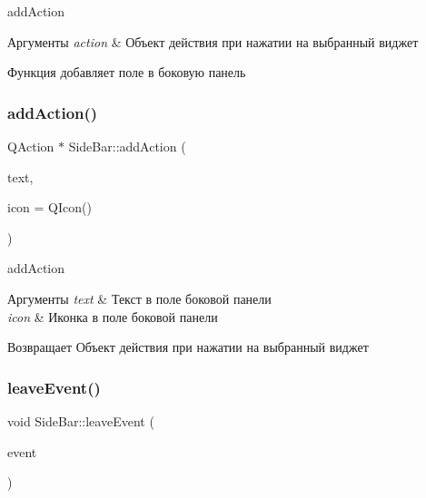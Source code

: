 add\+Action 


\begin{DoxyParams}{Аргументы}
{\em action} & Объект действия при нажатии на выбранный виджет\\
\hline
\end{DoxyParams}
Функция добавляет поле в боковую панель \mbox{\label{classSideBar_abcc7410af74a6e776a4d708a396f47ec}} 
\subsubsection{\texorpdfstring{add\+Action()}{addAction()}\hspace{0.1cm}{\footnotesize\ttfamily [2/2]}}
{\footnotesize\ttfamily Q\+Action $\ast$ Side\+Bar\+::add\+Action (\begin{DoxyParamCaption}\item[{const Q\+String \&}]{text,  }\item[{const Q\+Icon \&}]{icon = {\ttfamily QIcon()} }\end{DoxyParamCaption})}



add\+Action 


\begin{DoxyParams}{Аргументы}
{\em text} & Текст в поле боковой панели \\
\hline
{\em icon} & Иконка в поле боковой панели \\
\hline
\end{DoxyParams}
\begin{DoxyReturn}{Возвращает}
Объект действия при нажатии на выбранный виджет 
\end{DoxyReturn}
\mbox{\label{classSideBar_a123dcd87817fecdfacd60fd967044908}} 
\subsubsection{\texorpdfstring{leave\+Event()}{leaveEvent()}}
{\footnotesize\ttfamily void Side\+Bar\+::leave\+Event (\begin{DoxyParamCaption}\item[{Q\+Event $\ast$}]{event }\end{DoxyParamCaption})\hspace{0.3cm}{\ttfamily [protected]}}



